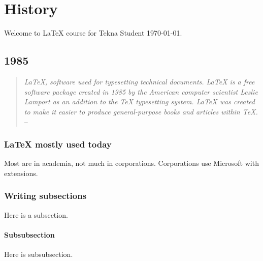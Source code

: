 \chapter{History}
Welcome to \LaTeX{} course for Tekna Student \today.

\section{1985}
\begin{quote}
    \textit{LaTeX, software used for typesetting technical documents. LaTeX is a free software package created in 1985 by the American computer scientist Leslie Lamport as an addition to the TeX typesetting system. LaTeX was created to make it easier to produce general-purpose books and articles within TeX.} -- \cite{LatexHistory}
\end{quote}

\subsection{\LaTeX{} mostly used today}
Most are in academia, not much in corporations. Corporations use Microsoft with extensions. 

\subsection{Writing subsections}
Here is a subsection.

\subsubsection{Subsubsection}
Here  is subsubsection.


